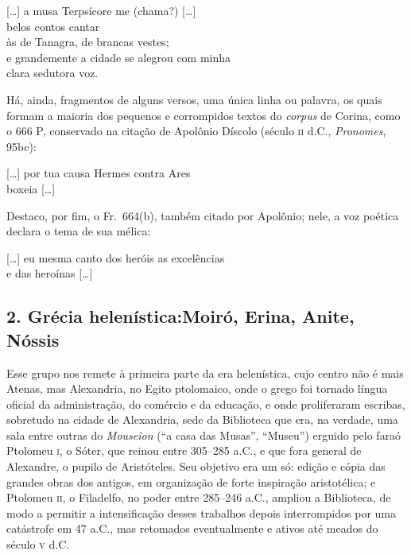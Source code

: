 \begin{hedraquote}
\mbox[\ldots{}] a musa Terpsícore me (chama?) [\ldots{}]\\
belos contos cantar\\
às de Tanagra, de brancas vestes;\\
e grandemente a cidade se alegrou com minha\\
clara sedutora voz.
\end{hedraquote}

Há, ainda, fragmentos de alguns versos, uma única linha ou palavra, os quais
formam a maioria dos pequenos e corrompidos textos do \textit{corpus} de
Corina, como o 666 P, conservado na citação de Apolônio Díscolo (século \textsc{ii}
d.C., \textit{Pronomes}, 95bc):

\begin{hedraquote}
\mbox[\ldots{}] por tua causa Hermes contra Ares\\
boxeia [\ldots{}]
\end{hedraquote}

Destaco, por fim, o Fr.~664(b), também citado por Apolônio; nele, a voz poética
declara o tema de sua mélica:

\begin{hedraquote}
\mbox[\ldots{}] eu mesma canto dos heróis as excelências\\
e das heroínas [\ldots{}]
\end{hedraquote}

\smallskip

\subsection{2. Grécia helenística:\break Moiró, Erina, Anite, Nóssis}

\smallskip

Esse grupo nos remete à primeira parte da era helenística, cujo centro não é
mais Atenas, mas Alexandria, no Egito ptolomaico, onde o grego foi tornado
língua oficial da administração, do comércio e da educação, e onde proliferaram
escribas, sobretudo na cidade de Alexandria, sede da Biblioteca que era, na
verdade, uma sala entre outras do \textit{Mouseîon} (“a casa das Musas”,
“Museu”) erguido pelo faraó Ptolomeu \textsc{i}, o Sóter, que reinou entre 305--285 a.C.,
e que fora general de Alexandre, o pupilo de Aristóteles. Seu objetivo era um
só: edição e cópia das grandes obras dos antigos, em organização de forte
inspiração aristotélica; e Ptolomeu \textsc{ii}, o Filadelfo, no poder entre 285--246
a.C., ampliou a Biblioteca, de modo a permitir a intensificação desses
trabalhos depois interrompidos por uma catástrofe em 47 a.C., mas retomados
eventualmente e ativos até meados do século \textsc{v} d.C. 

